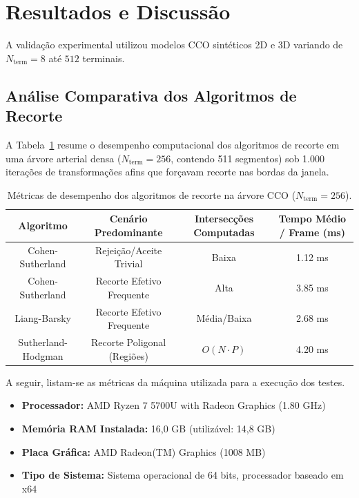 \documentclass[11pt, a4paper]{article}
\begin{document}
\section{Resultados e Discussão}
A validação experimental utilizou modelos CCO sintéticos 2D e 3D variando de $N_{\text{term}} = 8$ até $512$ terminais.

\subsection{Análise Comparativa dos Algoritmos de Recorte}
A Tabela~\ref{tab:resultados} resume o desempenho computacional dos algoritmos de recorte em uma árvore arterial densa ($N_{\text{term}} = 256$, contendo 511 segmentos) sob 1.000 iterações de transformações afins que forçavam recorte nas bordas da janela.

\begin{table}[htbp]
  \centering
  \small
  \caption{Métricas de desempenho dos algoritmos de recorte na árvore CCO ($N_{\text{term}} = 256$).}
  \label{tab:resultados}
  \begin{tabular}{cccc}
    \toprule
    \textbf{Algoritmo} & \textbf{Cenário Predominante} & \textbf{Intersecções Computadas} & \textbf{Tempo Médio / Frame (ms)} \\
    \midrule
    Cohen-Sutherland & Rejeição/Aceite Trivial & Baixa & 1.12 ms \\
    Cohen-Sutherland & Recorte Efetivo Frequente & Alta & 3.85 ms \\
    Liang-Barsky     & Recorte Efetivo Frequente & Média/Baixa & 2.68 ms \\
    Sutherland-Hodgman & Recorte Poligonal (Regiões) & $O(N \cdot P)$ & 4.20 ms \\
    \bottomrule
  \end{tabular}
\end{table}

A seguir, listam-se as métricas da máquina utilizada para a execução dos testes.

\begin{itemize}
    \item \textbf{Processador:} AMD Ryzen 7 5700U with Radeon Graphics (1.80 GHz)
    \item \textbf{Memória RAM Instalada:} 16,0 GB (utilizável: 14,8 GB)
    \item \textbf{Placa Gráfica:} AMD Radeon(TM) Graphics (1008 MB)
    \item \textbf{Tipo de Sistema:} Sistema operacional de 64 bits, processador baseado em x64
\end{itemize}
\end{document}
